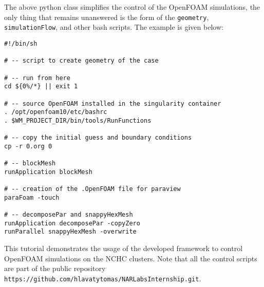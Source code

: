 The above python class simplifies the control of the OpenFOAM simulations, the only thing that remains unanswered is the form of the \texttt{geometry}, \texttt{simulationFlow}, and other bash scripts. The example is given below:
\begin{verbatim}
#!/bin/sh

# -- script to create geometry of the case

# -- run from here
cd ${0%/*} || exit 1

# -- source OpenFOAM installed in the singularity container
. /opt/openfoam10/etc/bashrc
. $WM_PROJECT_DIR/bin/tools/RunFunctions

# -- copy the initial guess and boundary conditions
cp -r 0.org 0

# -- blockMesh
runApplication blockMesh

# -- creation of the .OpenFOAM file for paraview
paraFoam -touch

# -- decomposePar and snappyHexMesh
runApplication decomposePar -copyZero
runParallel snappyHexMesh -overwrite
\end{verbatim} 

This tutorial demonstrates the usage of the developed framework to control OpenFOAM simulations on the NCHC clusters. Note that all the control scripts are part of the public repository \texttt{https://github.com/hlavatytomas/NARLabsInternship.git}.